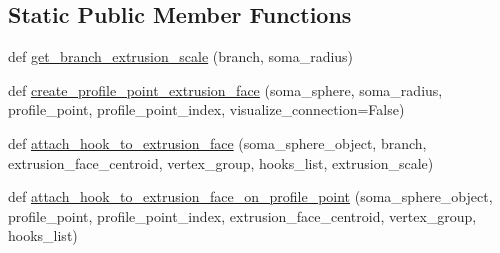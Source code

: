 \subsection*{Static Public Member Functions}
\begin{DoxyCompactItemize}
\item 
def \hyperlink{classmeshy_1_1neuromorphovis_1_1builders_1_1soma_1_1soma__builder_1_1SomaBuilder_aa8a48e246e1289f36d4a441ce58a36bf}{get\+\_\+branch\+\_\+extrusion\+\_\+scale} (branch, soma\+\_\+radius)
\item 
def \hyperlink{classmeshy_1_1neuromorphovis_1_1builders_1_1soma_1_1soma__builder_1_1SomaBuilder_a7dec0631e7853f3b0d662699ceb8a320}{create\+\_\+profile\+\_\+point\+\_\+extrusion\+\_\+face} (soma\+\_\+sphere, soma\+\_\+radius, profile\+\_\+point, profile\+\_\+point\+\_\+index, visualize\+\_\+connection=False)
\item 
def \hyperlink{classmeshy_1_1neuromorphovis_1_1builders_1_1soma_1_1soma__builder_1_1SomaBuilder_a41a0465463335ec0e4898ec2a3bfeac4}{attach\+\_\+hook\+\_\+to\+\_\+extrusion\+\_\+face} (soma\+\_\+sphere\+\_\+object, branch, extrusion\+\_\+face\+\_\+centroid, vertex\+\_\+group, hooks\+\_\+list, extrusion\+\_\+scale)
\item 
def \hyperlink{classmeshy_1_1neuromorphovis_1_1builders_1_1soma_1_1soma__builder_1_1SomaBuilder_ad3f885265070ea7702be1840a6dde3ba}{attach\+\_\+hook\+\_\+to\+\_\+extrusion\+\_\+face\+\_\+on\+\_\+profile\+\_\+point} (soma\+\_\+sphere\+\_\+object, profile\+\_\+point, profile\+\_\+point\+\_\+index, extrusion\+\_\+face\+\_\+centroid, vertex\+\_\+group, hooks\+\_\+list)
\end{DoxyCompactItemize}
